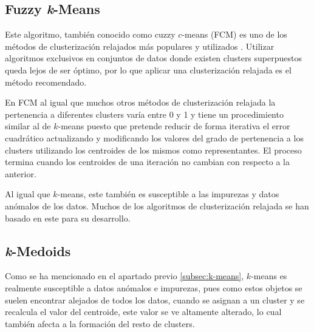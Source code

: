 \documentclass[10pt, a4paper]{article}
\begin{document}

\subsection{\textbf
{Fuzzy \textit{k}-Means}} \label{fuzzymeans}

Este algoritmo, también conocido como cuzzy $c$-means (FCM) \cite{fuzzymeans} es uno de los métodos de clusterización relajados más populares y utilizados \cite{otrolibro}. Utilizar algoritmos exclusivos en conjuntos de datos donde existen clusters superpuestos queda lejos de ser óptimo, por lo que aplicar una clusterización relajada es el método recomendado.

En FCM al igual que muchos otros métodos de clusterización relajada la pertenencia a diferentes clusters varía entre 0 y 1 y tiene un procedimiento similar al de $k$-means puesto que pretende reducir de forma iterativa el error cuadrático actualizando y modificando los valores del grado de pertenencia a los clusters utilizando los centroides de los mismos como representantes. El proceso termina cuando los centroides de una iteración no cambian con respecto a la anterior.

Al igual que $k$-means, este también es susceptible a las impurezas y datos anómalos de los datos. Muchos de los algoritmos de clusterización relajada se han basado en este para su desarrollo.





\subsection{\textbf{\textit{k}-Medoids}} \label{subsec:k-medoids}

Como se ha mencionado en el apartado previo \ref{subsec:k-means}, $k$-means es realmente susceptible a datos anómalos e impurezas, pues como estos objetos se suelen encontrar alejados de todos los datos, cuando se asignan a un cluster y se recalcula el valor del centroide, este valor se ve altamente alterado, lo cual también afecta a la formación del resto de clusters.
\end{document}
